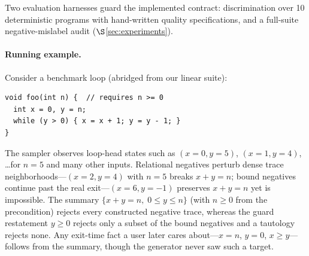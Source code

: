 Two evaluation harnesses guard the implemented contract: discrimination over 10 deterministic programs with hand-written quality specifications, and a full-suite negative-mislabel audit ($\S$\ref{sec:experiments}).

\paragraph{Running example.}
Consider a benchmark loop (abridged from our linear suite):
\begin{lstlisting}
void foo(int n) {  // requires n >= 0
  int x = 0, y = n;
  while (y > 0) { x = x + 1; y = y - 1; }
}
\end{lstlisting}
The sampler observes loop-head states such as $(x{=}0, y{=}5)$, $(x{=}1, y{=}4)$, \dots for $n{=}5$ and many other inputs.
Relational negatives perturb dense trace neighborhoods---$(x{=}2, y{=}4)$ with $n{=}5$ breaks $x + y = n$; bound negatives continue past the real exit---$(x{=}6, y{=}{-}1)$ preserves $x+y=n$ yet is impossible.
The summary $\{x + y = n,\; 0 \le y \le n\}$ (with $n \ge 0$ from the precondition) rejects every constructed negative trace, whereas the guard restatement $y \ge 0$ rejects only a subset of the bound negatives and a tautology rejects none.
Any exit-time fact a user later cares about---$x = n$, $y = 0$, $x \ge y$---follows from the summary, though the generator never saw such a target.
